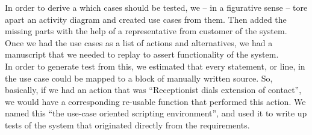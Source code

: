 In order to derive a which cases should be tested, we -- in a figurative sense --  tore apart an activity diagram and created use cases from them. Then added the missing parts with the help of a representative from customer of the system. Once we had the use cases as a list of actions and alternatives, we had a manuscript that we needed to replay to assert functionality of the system.\\
In order to generate test from this, we estimated that every statement, or line, in the use case could be mapped to a block of manually written source. So, basically, if we had an action that was ``Receptionist dials extension of contact'', we would have a corresponding re-usable function that performed this action. We named this ``the use-case oriented scripting environment'', and used it to write up tests of the system that originated directly from the requirements.


